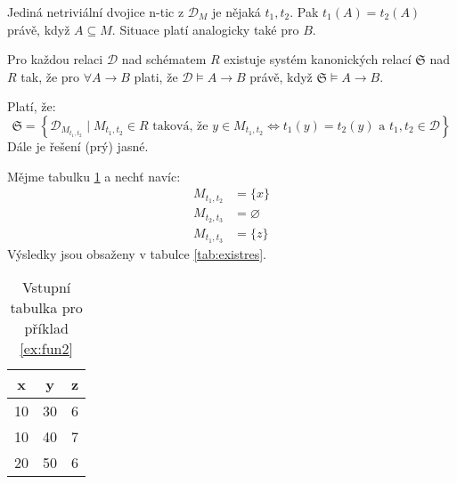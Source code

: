 \begin{upproof}
Jediná netriviální dvojice n-tic z $\mathcal{D}_{M}$ je nějaká $t_{1}, t_{2}$. Pak $t_{1}(A) = t_{2}(A)$ právě, když $A \subseteq M$. Situace platí analogicky také pro $B$.
\end{upproof}
\begin{upquote}
Pro každou relaci $\mathcal{D}$ nad schématem $R$ existuje systém kanonických relací $\mathfrak{S}$ nad $R$ tak, že pro $\forall A \to B$ plati, že $\mathcal{D} \vDash A \to B$ právě, když $\mathfrak{S} \vDash A \to B$.
\end{upquote}
\begin{upproof}
Platí, že:
$$
\mathfrak{S} = \left\{ \mathcal{D}_{M_{t_{1}, t_{2}}} \; | \; M_{t_{1}, t_{2}} \in R \text{ taková, že } y \in M_{t_{1}, t_{2}} \Leftrightarrow t_{1}(y) = t_{2}(y) \text{ a } t_{1}, t_{2} \in \mathcal{D} \right\}
$$
Dále je řešení (prý) jasné.
\end{upproof}
\begin{upexample}\label{ex:fun2}
Mějme tabulku \ref{tab:exist} a nechť navíc:
\begin{align*}
M_{t_{1}, t_{2}} &= \{ x \} \\
M_{t_{2}, t_{3}} &= \varnothing \\
M_{t_{1}, t_{3}} &= \{ z \}
\end{align*}
Výsledky jsou obsaženy v tabulce \ref{tab:existres}.
\end{upexample}
\begin{table}
\centering
\caption{Vstupní tabulka pro příklad \ref{ex:fun2}}\label{tab:exist}
\begin{tabular}{c c c}
x & y & z \\
\hline
10 & 30 & 6 \\
10 & 40 & 7 \\
20 & 50 & 6
\end{tabular}
\end{table}

